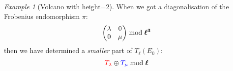 \documentclass[10pt,a4paper]{beamer}
\theoremstyle{plain}
\theoremstyle{definition}
\theoremstyle{definition}
\theoremstyle{definition}
\theoremstyle{definition}
\theoremstyle{remark}
\theoremstyle{remark}
\newtheorem{exe}[thm]{Example}
\begin{document}
\begin{frame}
\begin{columns}
\begin{column}[r]{7cm}
\begin{figure}[h]
\begin{center}
		\end{center} 
		\end{figure}
\end{column}
\end{columns}
\end{frame}

\begin{frame}
\begin{columns}

\begin{column}[l]{4cm}
\begin{exe}[Volcano with height=2]
When we got a diagonalisation of the Frobenius endomorphism $\pi$:
\[
\left( \begin{matrix}
\lambda & 0 \\
0 & \mu 
\end{matrix} \right) \bmod \textit{\boldmath  $\ell^3$ \unboldmath } 
\]
then we have determined a \emph{smaller} part of $T_{\ell}(E_0)$:
\[
\color{red}T_{\lambda} \color{black} \oplus \color{blue} T_{\mu} \color{black} \bmod \textit{\boldmath  $\ell$ \unboldmath }
\]
\end{exe}
\end{column}


\end{columns}
\end{frame}
\end{document}
